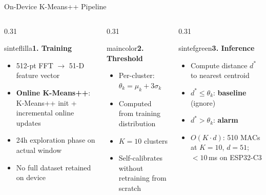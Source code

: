 
\begin{frame}[shrink=5]{On-Device K-Means++ Pipeline}
\begin{columns}[T,onlytextwidth]
\begin{column}{0.31\textwidth}
  \begin{colorblock}[white]{sinteflilla}{\small\textbf{1. Training}}
  \scriptsize
  \begin{itemize}\setlength\itemsep{2pt}
    \item 512-pt FFT $\rightarrow$ 51-D feature vector
    \item \textbf{Online K-Means++}: K-Means++ init + incremental online updates
    \item 24h exploration phase on actual window
    \item No full dataset retained on device
  \end{itemize}
  \end{colorblock}
\end{column}
\begin{column}{0.31\textwidth}
  \begin{colorblock}[white]{maincolor}{\small\textbf{2. Threshold}}
  \scriptsize
  \begin{itemize}\setlength\itemsep{2pt}
    \item Per-cluster: $\theta_k = \mu_k + 3\sigma_k$
    \item Computed from training distribution
    \item $K = 10$ clusters
    \item Self-calibrates without retraining from scratch
  \end{itemize}
  \end{colorblock}
\end{column}
\begin{column}{0.31\textwidth}
  \begin{colorblock}[white]{sintefgreen}{\small\textbf{3. Inference}}
  \scriptsize
  \begin{itemize}\setlength\itemsep{2pt}
    \item Compute distance $d^*$ to nearest centroid
    \item $d^* \leq \theta_k$: \textbf{baseline} (ignore)
    \item $d^* > \theta_k$: \textbf{alarm}
    \item $O(K{\cdot}d)$: 510 MACs at $K{=}10$, $d{=}51$; $<10$\,ms on ESP32-C3
  \end{itemize}

\end{colorblock}
\end{column}
\end{columns}
\end{frame}
